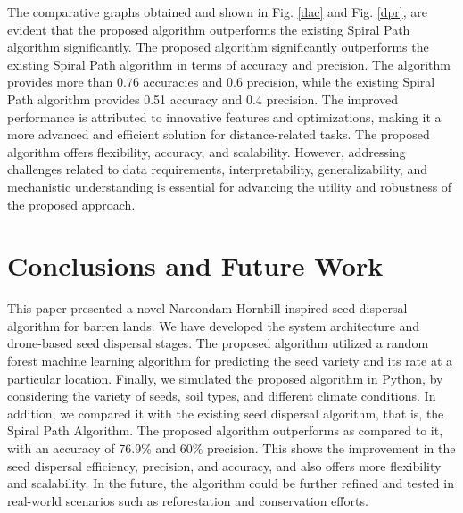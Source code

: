 \documentclass[conference]{IEEEtran}
\begin{document}
The comparative graphs obtained and shown in Fig. \ref{dac} and Fig. \ref{dpr}, are evident that the proposed algorithm outperforms the existing Spiral Path algorithm \cite{9} significantly. The proposed algorithm significantly outperforms the existing Spiral Path algorithm in terms of accuracy and precision. The algorithm provides more than 0.76 accuracies and 0.6 precision, while the existing Spiral Path algorithm provides 0.51 accuracy and 0.4 precision. The improved performance is attributed to innovative features and optimizations, making it a more advanced and efficient solution for distance-related tasks. The proposed algorithm offers flexibility, accuracy, and scalability. However, addressing challenges related to data requirements, interpretability, generalizability, and mechanistic understanding is essential for advancing the utility and robustness of the proposed approach.

\section{Conclusions and Future Work}
This paper presented a novel Narcondam Hornbill-inspired seed dispersal algorithm for barren lands. We have developed the system architecture and drone-based seed dispersal stages. The proposed algorithm utilized a random forest machine learning algorithm for predicting the seed variety and its rate at a particular location. Finally, we simulated the proposed algorithm in Python, by considering the variety of seeds, soil types, and different climate conditions. In addition, we compared it with the existing seed dispersal algorithm, that is, the Spiral Path Algorithm. The proposed algorithm outperforms as compared to it, with an accuracy of 76.9\% and 60\% precision. This shows the improvement in the seed dispersal efficiency, precision, and accuracy, and also offers more flexibility and scalability. In the future, the algorithm could be further refined and tested in real-world scenarios such as reforestation and conservation efforts.

\end{document}
